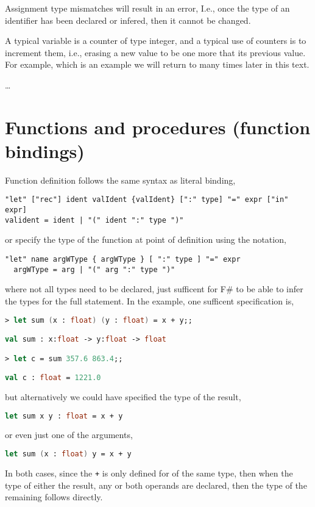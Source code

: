Assignment type mismatches will result in an error, 
%
%
I.e., once the type of an identifier has been declared or infered, then it cannot be changed.

A typical variable is a counter of type integer, and a typical use of counters is to increment them, i.e., erasing a new value to be one more that its previous value. For example,
%
%
which is an example we will return to many times later in this text.



\dots


\chapter{Functions and procedures (function bindings)}
\label{chap:functions}
Function definition follows the same syntax as literal binding,
%
\begin{lstlisting}[language=EBNF]
"let" ["rec"] ident valIdent {valIdent} [":" type] "=" expr ["in" expr]
valident = ident | "(" ident ":" type ")"
\end{lstlisting}

or specify the type of the function at point of definition using the notation,
\begin{lstlisting}[language=ebnf]
  "let" name argWType { argWType } [ ":" type ] "=" expr
  argWType = arg | "(" arg ":" type ")"
\end{lstlisting}
where not all types need to be declared, just sufficent for F\# to be able to infer the types for the full statement. In the example, one sufficent specification is,
\begin{lstlisting}[language=fsharp,caption=fsharpi]
> let sum (x : float) (y : float) = x + y;;

val sum : x:float -> y:float -> float

> let c = sum 357.6 863.4;;

val c : float = 1221.0
\end{lstlisting}
but alternatively we could have specified the type of the result,
\begin{lstlisting}[language=fsharp]
  let sum x y : float = x + y
\end{lstlisting}
or even just one of the arguments,
\begin{lstlisting}[language=fsharp]
  let sum (x : float) y = x + y
\end{lstlisting}
In both cases, since the \lstinline|+|  is only defined for  of the same type, then when the type of either the result, any or both operands are declared, then the type of the remaining follows directly.





